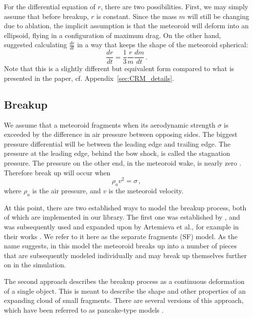For the differential equation of $r$, there are two possibilities. First, we may simply assume that before breakup, $r$ is constant. Since the mass $m$ will still be changing due to ablation, the implicit assumption is that the meteoroid will deform into an ellipsoid, flying in a configuration of maximum drag. On the other hand, \cite{avramenko2014simulation} suggested calculating $\frac{dr}{dt}$ in a way that keeps the shape of the meteoroid spherical:
\begin{equation}
    \frac{dr}{dt} = \frac{1}{3}\frac{r}{m}\frac{dm}{dt}\,.
    \label{eq:CRM_1}
\end{equation}
Note that this is a slightly different but equivalent form compared to what is presented in the paper, cf. Appendix~\ref{sec:CRM_details}.

\subsection{Breakup}

We assume that a meteoroid fragments when its aerodynamic strength $\sigma$ is exceeded by the difference in air pressure between opposing sides. The biggest pressure differential will be between the leading edge and trailing edge. The pressure at the leading edge, behind the bow shock, is called the stagnation pressure. The pressure on the other end, in the meteoroid wake, is nearly zero \citep{passey1980effects}. Therefore break up will occur when
\begin{equation}
    \rho_a v^2 = \sigma\,,
\end{equation}
where $\rho_a$ is the air pressure, and $v$ is the meteoroid velocity.

At this point, there are two established ways to model the breakup process, both of which are implemented in our library.
The first one was established by \cite{passey1980effects}, and was subsequently used and expanded upon by Artemieva et al., for example in their works \citep{artemieva1996interaction,artemieva2001motion}. We refer to it here as the separate fragments (SF) model. As the name suggests, in this model the meteoroid breaks up into a number of pieces that are subsequently modeled individually and may break up themselves further on in the simulation.

The second approach describes the breakup process as a continuous deformation of a single object. This is meant to describe the shape and other properties of an expanding cloud of small fragments. There are several versions of this approach, which have been referred to as pancake-type models \citep{wheeler2017fragmentcloud}. 

